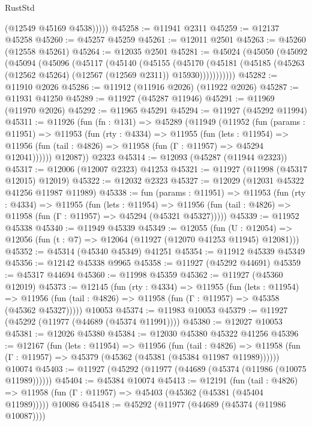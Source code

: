 \begin{lexlean}{RustStd}
\begin{coremodule}
            (@12549 @45169 @4538)))))
@45258 := @11941 @2311
@45259 := @12137 @45258
@45260 := @45257 @45259
@45261 := @12011 @2501
@45263 := @45260 (@12558 @45261)
@45264 := @12035 @2501
@45281 := @45024
    (@45050
      (@45092
        (@45094
          (@45096
            (@45117
              (@45140
                (@45155
                  (@45170
                    (@45181
                      (@45185 (@45263 (@12562 @45264) (@12567 (@12569 @2311)) @15930)))))))))))
@45282 := @11910 @2026
@45286 := @11912 (@11916 @2026) (@11922 @2026)
@45287 := @11931 @41250
@45289 := @11927 (@45287 @11946)
@45291 := @11969 (@11970 @2026)
@45292 := @11965 @45291
@45294 := @11927 (@45292 @11994)
@45311 := @11926
    (fun (fn : @131) =>
    @45289
      (@11949
        (@11952
          (fun (params : @11951) =>
          @11953
            (fun (rty : @4334) =>
            @11955
              (fun (lets : @11954) =>
              @11956 (fun (tail : @4826) => @11958 (fun (Γ : @11957) => @45294 @12041))))))
        @12087))
    @2323
@45314 := @12093 (@45287 (@11944 @2323))
@45317 := @12006 (@12007 @2323) @41253
@45321 := @11927 (@11998 (@45317 @12015) @12019)
@45322 := @12032 @2323
@45327 := @12029 (@12031 @45322 @41256 @11987 @11989)
@45338 := fun (params : @11951) =>
  @11953
    (fun (rty : @4334) =>
    @11955
      (fun (lets : @11954) =>
      @11956 (fun (tail : @4826) => @11958 (fun (Γ : @11957) => @45294 (@45321 @45327)))))
@45339 := @11952 @45338
@45340 := @11949 @45339
@45349 := @12055
    (fun (U : @12054) => @12056 (fun (t : @7) => @12064 (@11927 (@12070 @41253 @11945) @12081)))
@45352 := @45314 (@45340 @45349) @41251
@45354 := @11912 @45339 @45349
@45356 := @12142 @45338 @9965
@45358 := @11927 (@45292 @44691)
@45359 := @45317 @44694
@45360 := @11998 @45359
@45362 := @11927 (@45360 @12019)
@45373 := @12145
    (fun (rty : @4334) =>
    @11955
      (fun (lets : @11954) =>
      @11956 (fun (tail : @4826) => @11958 (fun (Γ : @11957) => @45358 (@45362 @45327)))))
    @10053
@45374 := @11983 @10053
@45379 := @11927 (@45292 (@11977 (@44689 (@45374 @11991))))
@45380 := @12027 @10053
@45381 := @12026 @45380
@45384 := @12030 @45380 @45322 @41256
@45396 := @12167
    (fun (lets : @11954) =>
    @11956
      (fun (tail : @4826) =>
      @11958 (fun (Γ : @11957) => @45379 (@45362 (@45381 (@45384 @11987 @11989))))))
    @10074
@45403 := @11927 (@45292 (@11977 (@44689 (@45374 (@11986 (@10075 @11989))))))
@45404 := @45384 @10074
@45413 := @12191
    (fun (tail : @4826) => @11958 (fun (Γ : @11957) => @45403 (@45362 (@45381 (@45404 @11989)))))
    @10086
@45418 := @45292 (@11977 (@44689 (@45374 (@11986 @10087))))

\end{coremodule}
\end{lexlean}
